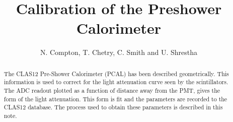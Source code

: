 \documentclass[letterpaper,10pt]{article}
\title{Calibration of the Preshower Calorimeter}
\author{N. Compton, T. Chetry, C. Smith and U. Shrestha}
\begin{document}
\maketitle

\begin{abstract}
The CLAS12 Pre-Shower Calorimeter (PCAL) has been described geometrically. This information is used to correct 
for the light attenuation curve seen by the scintillators. The ADC readout plotted as a function of distance 
away from the PMT, gives the form of the light attenuation. This form is fit and the parameters are recorded 
to the CLAS12 database. The process used to obtain these parameters is described in this note.
\end{abstract} 


\tableofcontents
\clearpage



%
















\end{document}
